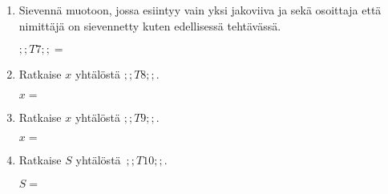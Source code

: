 \documentclass[finnish, a4paper, 12pt]{article}
\begin{document}
\begin{enumerate}[leftmargin=*]
		\item %
		Sievennä %
		muotoon, jossa esiintyy vain yksi jakoviiva ja sekä osoittaja
		että nimittäjä on sievennetty kuten edellisessä tehtävässä.
		
		\(
		\displaystyle
		;;T7;; =
		\) %
		
		\vspace{8pt}
		
		\item %
		Ratkaise \(x\) yhtälöstä \(;;T8;;\).
		
		\(
		x = 
		\)	%
		
		\vspace{8pt}
		
		\item %
		Ratkaise \(x\) yhtälöstä \(;;T9;;\).
		
		\(
		x = 		
		\)	%
		
		\vspace{8pt}
		
		\item %
		Ratkaise \(S\) yhtälöstä 
		\(
		\displaystyle \,
		;;T10;; .
		\)	
		
		\(
		S = 
		\) %
		
	\end{enumerate}
	
	
\end{document}
